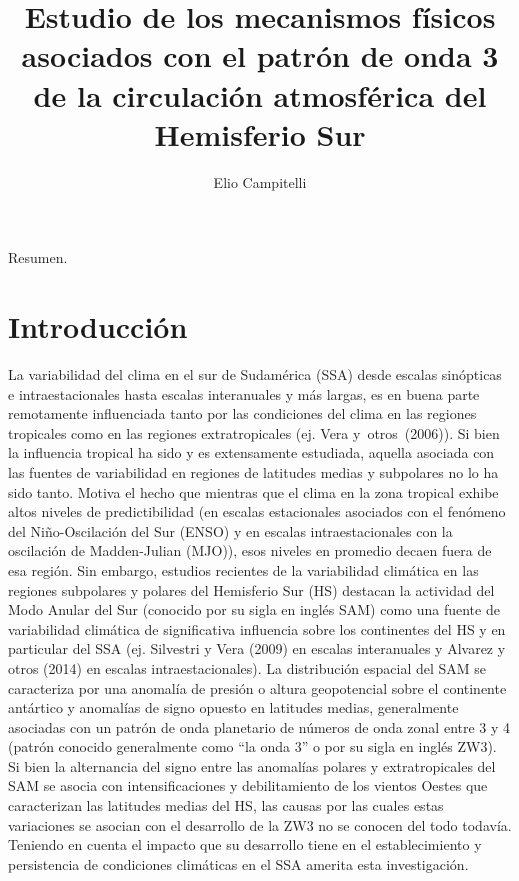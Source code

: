 \documentclass[spanish,a4paper]{book}
\title{Estudio de los mecanismos físicos asociados con el patrón de onda 3 de
la circulación atmosférica del Hemisferio Sur}
\author{Elio Campitelli}
\date{}
\begin{document}
\maketitle

{
\setcounter{tocdepth}{3}
\tableofcontents
}
Resumen.


\chapter{Introducción}\label{introduccion}

La variabilidad del clima en el sur de Sudamérica (SSA) desde escalas
sinópticas e intraestacionales hasta escalas interanuales y más largas,
es en buena parte remotamente influenciada tanto por las condiciones del
clima en las regiones tropicales como en las regiones extratropicales
(ej. Vera y~otros~(2006)). Si bien la influencia tropical ha sido y es
extensamente estudiada, aquella asociada con las fuentes de variabilidad
en regiones de latitudes medias y subpolares no lo ha sido tanto. Motiva
el hecho que mientras que el clima en la zona tropical exhibe altos
niveles de predictibilidad (en escalas estacionales asociados con el
fenómeno del Niño-Oscilación del Sur (ENSO) y en escalas
intraestacionales con la oscilación de Madden-Julian (MJO)), esos
niveles en promedio decaen fuera de esa región. Sin embargo, estudios
recientes de la variabilidad climática en las regiones subpolares y
polares del Hemisferio Sur (HS) destacan la actividad del Modo Anular
del Sur (conocido por su sigla en inglés SAM) como una fuente de
variabilidad climática de significativa influencia sobre los continentes
del HS y en particular del SSA (ej. Silvestri y Vera (2009) en escalas
interanuales y Alvarez y otros (2014) en escalas intraestacionales). La
distribución espacial del SAM se caracteriza por una anomalía de presión
o altura geopotencial sobre el continente antártico y anomalías de signo
opuesto en latitudes medias, generalmente asociadas con un patrón de
onda planetario de números de onda zonal entre 3 y 4 (patrón conocido
generalmente como ``la onda 3'' o por su sigla en inglés ZW3). Si bien
la alternancia del signo entre las anomalías polares y extratropicales
del SAM se asocia con intensificaciones y debilitamiento de los vientos
Oestes que caracterizan las latitudes medias del HS, las causas por las
cuales estas variaciones se asocian con el desarrollo de la ZW3 no se
conocen del todo todavía. Teniendo en cuenta el impacto que su
desarrollo tiene en el establecimiento y persistencia de condiciones
climáticas en el SSA amerita esta investigación.
\end{document}
